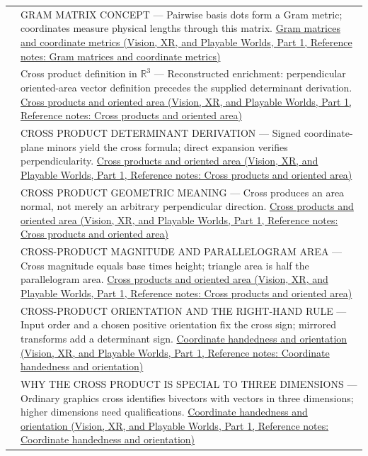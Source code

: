 {\begin{longtable}[]{@{}
  >{\raggedright\arraybackslash}p{}
  >{\raggedright\arraybackslash}p{}@{}}
541 & GRAM MATRIX CONCEPT --- Pairwise basis dots form a Gram metric; coordinates measure physical lengths through this matrix. \href{../07-Vision-XR-and-Playable-Worlds-P01/main.pdf\#nameddest=appendix-3b863809f82a}{Gram matrices and coordinate metrics (Vision, XR, and Playable Worlds, Part 1, Reference notes: Gram matrices and coordinate metrics)} \\
542 & Cross product definition in \(\mathbb R^3\) --- Reconstructed enrichment: perpendicular oriented-area vector definition precedes the supplied determinant derivation. \href{../07-Vision-XR-and-Playable-Worlds-P01/main.pdf\#nameddest=appendix-2391db8052b1}{Cross products and oriented area (Vision, XR, and Playable Worlds, Part 1, Reference notes: Cross products and oriented area)} \\
543 & CROSS PRODUCT DETERMINANT DERIVATION --- Signed coordinate-plane minors yield the cross formula; direct expansion verifies perpendicularity. \href{../07-Vision-XR-and-Playable-Worlds-P01/main.pdf\#nameddest=appendix-2391db8052b1}{Cross products and oriented area (Vision, XR, and Playable Worlds, Part 1, Reference notes: Cross products and oriented area)} \\
544 & CROSS PRODUCT GEOMETRIC MEANING --- Cross produces an area normal, not merely an arbitrary perpendicular direction. \href{../07-Vision-XR-and-Playable-Worlds-P01/main.pdf\#nameddest=appendix-2391db8052b1}{Cross products and oriented area (Vision, XR, and Playable Worlds, Part 1, Reference notes: Cross products and oriented area)} \\
545 & CROSS-PRODUCT MAGNITUDE AND PARALLELOGRAM AREA --- Cross magnitude equals base times height; triangle area is half the parallelogram area. \href{../07-Vision-XR-and-Playable-Worlds-P01/main.pdf\#nameddest=appendix-2391db8052b1}{Cross products and oriented area (Vision, XR, and Playable Worlds, Part 1, Reference notes: Cross products and oriented area)} \\
546 & CROSS-PRODUCT ORIENTATION AND THE RIGHT-HAND RULE --- Input order and a chosen positive orientation fix the cross sign; mirrored transforms add a determinant sign. \href{../07-Vision-XR-and-Playable-Worlds-P01/main.pdf\#nameddest=appendix-87d7626c8d37}{Coordinate handedness and orientation (Vision, XR, and Playable Worlds, Part 1, Reference notes: Coordinate handedness and orientation)} \\
547 & WHY THE CROSS PRODUCT IS SPECIAL TO THREE DIMENSIONS --- Ordinary graphics cross identifies bivectors with vectors in three dimensions; higher dimensions need qualifications. \href{../07-Vision-XR-and-Playable-Worlds-P01/main.pdf\#nameddest=appendix-87d7626c8d37}{Coordinate handedness and orientation (Vision, XR, and Playable Worlds, Part 1, Reference notes: Coordinate handedness and orientation)} \\

\end{longtable}}
